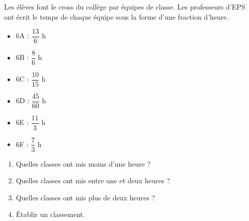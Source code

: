 \begin{exercice*}
   Les élèves font le cross du collège par équipes de classe. Les professeurs d'EPS ont écrit le temps de chaque équipe sous la forme d'une fraction d'heure. \ \medskip
   \begin{multicols}{3}
      \begin{itemize}
         \item 6A : $\dfrac{13}{6}$ h \bigskip
         \item 6B : $\dfrac86$ h \bigskip
         \item 6C : $\dfrac{10}{15}$ h \bigskip
         \item 6D : $\dfrac{45}{60}$ h \bigskip
         \item 6E : $\dfrac{11}3$ h \bigskip
         \item 6F : $\dfrac73$ h
      \end{itemize}
   \end{multicols}
   \vspace*{-5mm}
   \begin{enumerate}
      \item Quelles classes ont mis moins d'une heure ?
      \item Quelles classes ont mis entre une et deux heures ?
      \item Quelles classes ont mis plus de deux heures ?
      \item Établir un classement.
   \end{enumerate}
\end{exercice*}